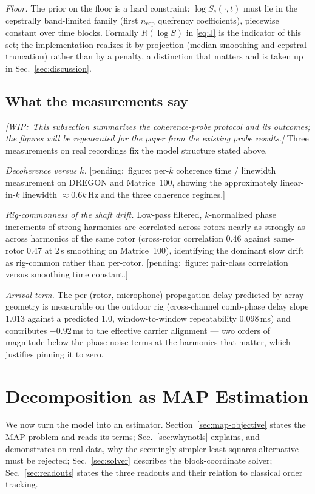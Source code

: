 \documentclass[journal]{IEEEtran}
\newcommand{\pending}[1]{{\color{gray}\textsf{[pending:~#1]}}}
\newcommand{\wip}[1]{{\color{gray!70!black}\textit{[WIP:~#1]}}}
\begin{document}
\emph{Floor.} The prior on the floor is a hard constraint:
$\log S_c(\cdot, t)$ must lie in the cepstrally band-limited family
(first $n_{\mathrm{cep}}$ quefrency coefficients), piecewise constant
over time blocks. Formally $R(\log S)$ in \eqref{eq:J} is the indicator
of this set; the implementation realizes it by projection (median
smoothing and cepstral truncation) rather than by a penalty, a
distinction that matters and is taken up in
Sec.~\ref{sec:discussion}.

\subsection{What the measurements say}
\label{sec:model-measurements}

\wip{This subsection summarizes the coherence-probe protocol and its
outcomes; the figures will be regenerated for the paper from the
existing probe results.} Three measurements on real recordings fix the
model structure stated above.

\emph{Decoherence versus $k$.} \pending{figure: per-$k$ coherence time /
linewidth measurement on DREGON and Matrice~100, showing the
approximately linear-in-$k$ linewidth $\approx 0.6k$\,Hz and the three
coherence regimes.}

\emph{Rig-commonness of the shaft drift.} Low-pass filtered,
$k$-normalized phase increments of strong harmonics are correlated
across rotors nearly as strongly as across harmonics of the same rotor
(cross-rotor correlation $0.46$ against same-rotor $0.47$ at $2$\,s
smoothing on Matrice~100), identifying the dominant slow drift as
rig-common rather than per-rotor. \pending{figure: pair-class
correlation versus smoothing time constant.}

\emph{Arrival term.} The per-(rotor, microphone) propagation delay
predicted by array geometry is measurable on the outdoor rig
(cross-channel comb-phase delay slope $1.013$ against a predicted $1.0$,
window-to-window repeatability $0.098$\,ms) and contributes $-0.92$\,ms
to the effective carrier alignment --- two orders of magnitude below the
phase-noise terms at the harmonics that matter, which justifies pinning
it to zero.

\section{Decomposition as MAP Estimation}
\label{sec:map}

We now turn the model into an estimator. Section~\ref{sec:map-objective}
states the MAP problem and reads its terms;
Sec.~\ref{sec:whynotls} explains, and demonstrates on real data, why the
seemingly simpler least-squares alternative must be rejected;
Sec.~\ref{sec:solver} describes the block-coordinate solver;
Sec.~\ref{sec:readouts} states the three readouts and their relation to
classical order tracking.
\end{document}
